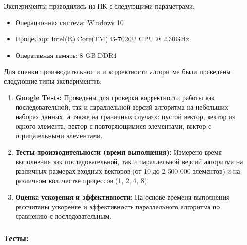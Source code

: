 \documentclass[12pt]{article}
\begin{document}
\hspace*{1.25em}Эксперименты проводились на ПК с следующими параметрами:

\begin{itemize}
    \item Операционная система: Windows 10
    \item Процессор: Intel(R) Core(TM) i3-7020U CPU @ 2.30GHz
    \item Оперативная память: 8 GB DDR4
\end{itemize}
\hspace*{1.25em}Для оценки производительности и корректности алгоритма были проведены следующие типы экспериментов:

\begin{enumerate}
    \item \textbf{ Google Tests:} Проведены для проверки корректности работы как последовательной, так и параллельной версий алгоритма на небольших наборах данных, а также на граничных случаях: пустой вектор, вектор из одного элемента, вектор с повторяющимися элементами, вектор с отрицательными элементами.
    \item \textbf{Тесты производительности (время выполнения):} Измерено время выполнения как последовательной, так и параллельной версий алгоритма на различных размерах входных векторов (от 10 до 2 500 000 элементов) и на различном количестве процессов (1, 2, 4, 8).
    \item \textbf{Оценка ускорения и эффективности:} На основе времени выполнения рассчитаны ускорение и эффективность параллельного алгоритма по сравнению с последовательным.
\end{enumerate}
\subsubsection*{Тесты:}
\end{document}
